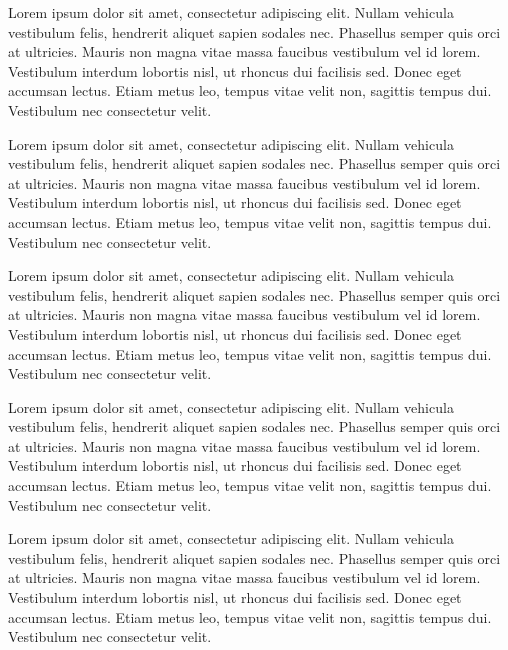 Lorem ipsum dolor sit amet, consectetur adipiscing elit. Nullam vehicula vestibulum felis, hendrerit aliquet sapien sodales nec. Phasellus semper quis orci at ultricies. Mauris non magna vitae massa faucibus vestibulum vel id lorem. Vestibulum interdum lobortis nisl, ut rhoncus dui facilisis sed. Donec eget accumsan lectus. Etiam metus leo, tempus vitae velit non, sagittis tempus dui. Vestibulum nec consectetur velit.


Lorem ipsum dolor sit amet, consectetur adipiscing elit. Nullam vehicula vestibulum felis, hendrerit aliquet sapien sodales nec. Phasellus semper quis orci at ultricies. Mauris non magna vitae massa faucibus vestibulum vel id lorem. Vestibulum interdum lobortis nisl, ut rhoncus dui facilisis sed. Donec eget accumsan lectus. Etiam metus leo, tempus vitae velit non, sagittis tempus dui. Vestibulum nec consectetur velit.


Lorem ipsum dolor sit amet, consectetur adipiscing elit. Nullam vehicula vestibulum felis, hendrerit aliquet sapien sodales nec. Phasellus semper quis orci at ultricies. Mauris non magna vitae massa faucibus vestibulum vel id lorem. Vestibulum interdum lobortis nisl, ut rhoncus dui facilisis sed. Donec eget accumsan lectus. Etiam metus leo, tempus vitae velit non, sagittis tempus dui. Vestibulum nec consectetur velit.


Lorem ipsum dolor sit amet, consectetur adipiscing elit. Nullam vehicula vestibulum felis, hendrerit aliquet sapien sodales nec. Phasellus semper quis orci at ultricies. Mauris non magna vitae massa faucibus vestibulum vel id lorem. Vestibulum interdum lobortis nisl, ut rhoncus dui facilisis sed. Donec eget accumsan lectus. Etiam metus leo, tempus vitae velit non, sagittis tempus dui. Vestibulum nec consectetur velit.


Lorem ipsum dolor sit amet, consectetur adipiscing elit. Nullam vehicula vestibulum felis, hendrerit aliquet sapien sodales nec. Phasellus semper quis orci at ultricies. Mauris non magna vitae massa faucibus vestibulum vel id lorem. Vestibulum interdum lobortis nisl, ut rhoncus dui facilisis sed. Donec eget accumsan lectus. Etiam metus leo, tempus vitae velit non, sagittis tempus dui. Vestibulum nec consectetur velit.

